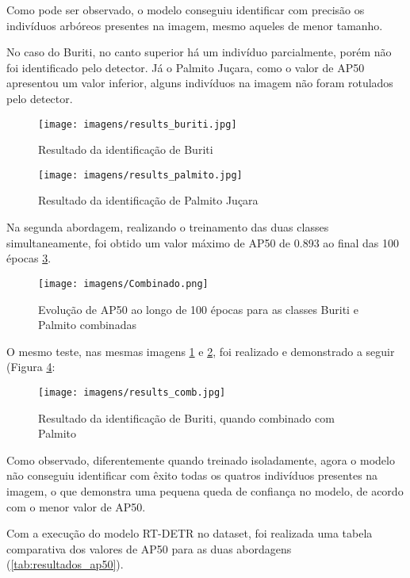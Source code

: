 Como pode ser observado, o modelo conseguiu identificar com precisão os indivíduos arbóreos presentes na imagem, mesmo aqueles de menor tamanho.

No caso do Buriti, no canto superior há um indivíduo parcialmente, porém não foi identificado pelo detector. Já o Palmito Juçara, como o valor de AP50 apresentou um valor inferior, alguns indivíduos na imagem não foram rotulados pelo detector.

\begin{figure}[H]
    \centering
    \texttt{[image: imagens/results\_buriti.jpg]}
    \caption{Resultado da identificação de Buriti}
    \label{fig:resultado_buriti}
\end{figure}

\begin{figure}
    \centering
    \texttt{[image: imagens/results\_palmito.jpg]}
    \caption{Resultado da identificação de Palmito Juçara}
    \label{fig:resultado_palmito}
\end{figure}

Na segunda abordagem, realizando o treinamento das duas classes simultaneamente, foi obtido um valor máximo de AP50 de 0.893 ao final das 100 épocas \ref{fig:resultado_comb}.

\begin{figure}[H]
    \centering
    \texttt{[image: imagens/Combinado.png]}
    \caption{Evolução de AP50 ao longo de 100 épocas para as classes Buriti e Palmito combinadas}
    \label{fig:resultado_comb}
\end{figure}



O mesmo teste, nas mesmas imagens \ref{fig:resultado_buriti} e \ref{fig:resultado_palmito}, foi realizado e demonstrado a seguir (Figura \ref{fig:resultado_combinado}:


\begin{figure}[H]
    \centering
    \texttt{[image: imagens/results\_comb.jpg]}
    \caption{Resultado da identificação de Buriti, quando combinado com Palmito}
    \label{fig:resultado_combinado}
\end{figure}

Como observado, diferentemente quando treinado isoladamente, agora o modelo não conseguiu identificar com êxito todas os quatros indivíduos presentes na imagem, o que demonstra uma pequena queda de confiança no modelo, de acordo com o menor valor de AP50. 

Com a execução do modelo RT-DETR no dataset, foi realizada uma tabela comparativa dos valores de AP50 para as duas abordagens (\cref{tab:resultados_ap50}).

